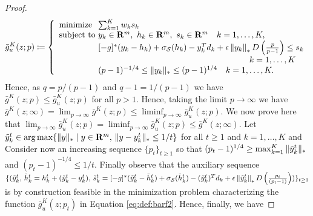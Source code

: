 \begin{proof}
  \begin{equation}
    \label{eq:def:barf2}
    \bar g_u^K(z;p)\defn \left\{
      \begin{array}{l@{~}l}
        \mbox{minimize} & \sum_{k=1}^K w_k s_k\\
        \mbox{subject to} &  y_{k}\in \Re^m, ~h_{k}\in \Re^m, ~s_k\in \Re^m \quad k =1,\dots, K,\\
             &  [-g]^*(y_{k} - h_{k}) + \sigma_{\supp}(h_{k}) - y_{k}^T{d}_k  +\epsilon \left\|y_{k} \right\|_* D\left(\frac{p}{p-1}\right) \le s_k\\
						 &\hspace{6cm} \quad k =1,\dots, K\\
             & (p-1)^{-1/4} \leq \norm{y_k}_* \leq (p-1)^{1/4}\quad  k =1,\dots, K.
      \end{array}
    \right.
  \end{equation}
  Hence, as $q=p/(p-1)$ and $q-1=1/(p-1)$  we have
  \(
    \bar g^K(z;p) \leq \bar g_u^K(z;p)
  \)
  for all $p>1$.
  Hence, taking the limit $p\to\infty$ we have $\bar g^K(z;\infty)=\lim_{p\to\infty} \bar g^K(z;p) \leq \liminf_{p\to\infty} \bar g_u^K(z;p)$.
    We now prove here that $\lim_{p\to\infty} \bar g_u^K(z;p) = \liminf_{p\to\infty} \bar g_u^K(z;p)\leq \bar g^K(z;\infty)$. 
  Let $\tilde y^t_{k}\in \arg\max \{ \| y \|_* \mid y\in {\mathbf R}^m, \, \| y-y_k^t \|_*\leq 1/t \}$ for all $t\geq 1$ and $k=1,\dots, K$ and 
  Consider now an increasing sequence $\{p_t\}_{t\geq 1}$ so that $(p_t-1)^{1/4}\geq \max^K_{k=1} \| \tilde y^t_k \|_*$ and $(p_t-1)^{-1/4}\leq 1/t$.
  Finally observe that the auxiliary sequence $\{(\tilde y^t_{k}, \,\tilde h^t_{k}=h^t_k + (\tilde y^t_{k}-y^t_{k}), \,\tilde s^t_k= [-g]^*(\tilde y^t_{k} - \tilde h^t_{k}) + \sigma_{\mathcal{S}}(\tilde h^t_{k}) - (\tilde y^t_{k})^T{d}_k  +\epsilon \left\|\tilde y^t_{k} \right\|_* D\left(\tfrac{p_t}{(p_t-1)}\right))\}_{t\geq 1}$ is by construction feasible in the minimization problem characterizing the function $\bar g_u^K(z;p_t)$ in Equation \eqref{eq:def:barf2}. Hence, finally, we have

\end{proof}
